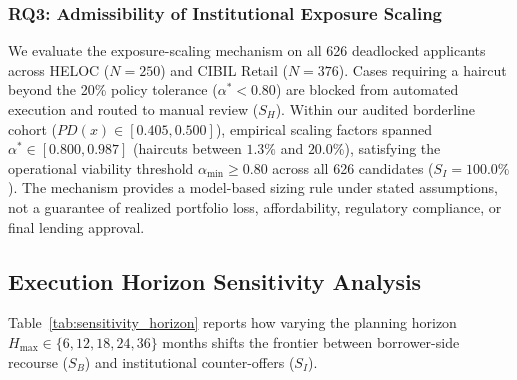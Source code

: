 \documentclass[manuscript,screen,review,anonymous]{acmart}
\begin{document}
\subsubsection{RQ3: Admissibility of Institutional Exposure Scaling}
We evaluate the exposure-scaling mechanism on all 626 deadlocked applicants across HELOC ($N=250$) and CIBIL Retail ($N=376$). Cases requiring a haircut beyond the 20\% policy tolerance ($\alpha^* < 0.80$) are blocked from automated execution and routed to manual review ($S_H$). Within our audited borderline cohort ($PD(x) \in [0.405, 0.500]$), empirical scaling factors spanned $\alpha^* \in [0.800, 0.987]$ (haircuts between $1.3\%$ and $20.0\%$), satisfying the operational viability threshold $\alpha_{\min} \ge 0.80$ across all 626 candidates ($S_I = 100.0\%$). The mechanism provides a model-based sizing rule under stated assumptions, not a guarantee of realized portfolio loss, affordability, regulatory compliance, or final lending approval.

\subsection{Execution Horizon Sensitivity Analysis}
Table~\ref{tab:sensitivity_horizon} reports how varying the planning horizon $H_{\max} \in \{6, 12, 18, 24, 36\}$ months shifts the frontier between borrower-side recourse ($S_B$) and institutional counter-offers ($S_I$).
\end{document}
